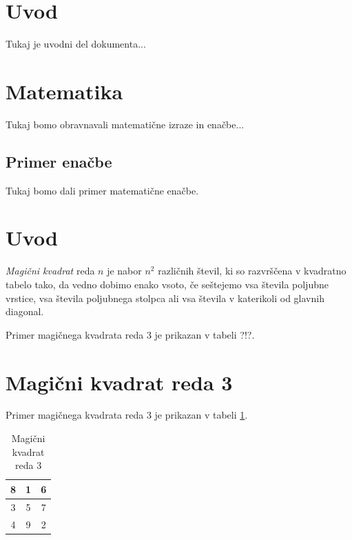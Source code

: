 \documentclass[a4paper,12pt]{article}
\begin{document}
\section{Uvod}
Tukaj je uvodni del dokumenta...

\section{Matematika}
Tukaj bomo obravnavali matematične izraze in enačbe...

\subsection{Primer enačbe}
Tukaj bomo dali primer matematične enačbe.


\newpage

\section{Uvod}

   \emph{Magični kvadrat} reda $n$ je nabor $n^2$ različnih števil,
   ki so razvrščena v kvadratno tabelo tako, da vedno dobimo enako vsoto,
   če seštejemo vsa števila poljubne vrstice, vsa števila poljubnega
   stolpca ali vsa števila v katerikoli od glavnih diagonal.

Primer magičnega kvadrata reda 3 je prikazan v tabeli ?!?.

\section{Magični kvadrat reda 3}

Primer magičnega kvadrata reda 3 je prikazan v tabeli \ref{table:mag3}.

\begin{table}[h]
\centering
\caption{Magični kvadrat reda 3}  %
\label{table:mag3}  %
\begin{tabular}{|c|c|c|}
\hline
8 & 1 & 6 \\\hline
3 & 5 & 7 \\\hline
4 & 9 & 2 \\\hline
\end{tabular}
\end{table}
\end{document}

